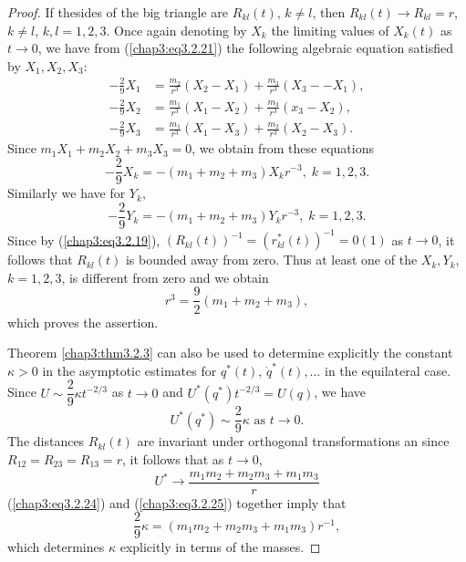 \begin{proof}
If the\pageoriginale sides of the big triangle are $R_{kl} (t)$, $k
\neq l$, then $R_{kl}(t) \to R_{kl} = r$, $k \neq l$, $k,l =
1,2,3$. Once again denoting by $X_k$ the limiting values of $X_k(t)$
as $t \to 0$, we have from (\ref{chap3:eq3.2.21}) the following
algebraic equation satisfied by $X_1, X_2, X_3$: 
\begin{align*}
-\frac{2}{9} X_1 &= \frac{m_2}{r^3} (X_2 - X_1) + \frac{m_3}{r^3} (X_3 
 - - X_1),\\
- \frac{2}{9} X_2 &= \frac{m_1}{r^3} (X_1 - X_2) + \frac{m_3}{r^3}
(x_3 - X_2), \\ 
- \frac{2}{9} X_3 &= \frac{m_1}{r^3} (X_1 - X_3) + \frac{m_2}{r^3}
(X_2 - X_3).  
\end{align*}
Since $m_1 X_1 + m_2 X_2 + m_3 X_3 = 0$, we obtain from these equations
$$
-\frac{2}{9} X_k =  -(m_1 + m_2 + m_3) X_k r^{-3},  \; k = 1,2,3.
$$
Similarly we have for $Y_k$,
$$
-\frac{2}{9} Y_k = - (m_1 + m_2 + m_3) Y_k r^{-3}, \; k = 1,2,3. 
$$
Since by (\ref{chap3:eq3.2.19}), $(R_{kl} (t))^{-1} = (r^*_{kl}
(t))^{-1} = 0(1)$ as $t \to 0$, it follows that $R_{kl} (t)$ is
bounded away from zero. Thus at least one of the $X_k, Y_k$,
$k=1,2,3$, is different from zero and we obtain 
$$
r^3 = \frac{9}{2} (m_1 + m_2 + m_3), 
$$
which proves the assertion.

Theorem \ref{chap3:thm3.2.3} can also be used to determine explicitly
the constant $\kappa > 0$ in the asymptotic estimates for $q^* (t)$,
$\dot{q}^*(t), \ldots $ in the equilateral case. Since $U \sim
\dfrac{2}{9} \kappa t^{-2/3}$ as $t \to 0$ and $U^* (q^*) t^{-2/3} =
U(q)$, we have  
\begin{equation*}
U^* (q^*) \sim\frac{2}{9} \kappa \text{ as } t \to 0.\tag{3.2.24}\label{chap3:eq3.2.24}
\end{equation*}\pageoriginale
The distances $R_{kl} (t)$ are invariant under orthogonal
transformations an since $R_{12} = R_{23} = R_{13} = r$, it follows
that as $t \to 0$, 
\begin{equation*}
U^* \to \frac{m_1 m_2 + m_2 m_3 + m_1 m_3}{r}\tag{3.2.25}\label{chap3:eq3.2.25}
\end{equation*}
(\ref{chap3:eq3.2.24}) and (\ref{chap3:eq3.2.25}) together imply that
$$
\frac{2}{9} \kappa = (m_1 m_2 + m_2 m_3 + m_1 m_3)r^{-1}, 
$$
which determines $\kappa$ explicitly in terms of the masses.


\end{proof}
